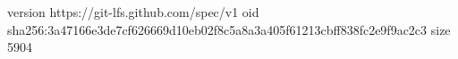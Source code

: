 version https://git-lfs.github.com/spec/v1
oid sha256:3a47166e3de7cf626669d10eb02f8c5a8a3a405f61213cbff838fc2e9f9ac2c3
size 5904
